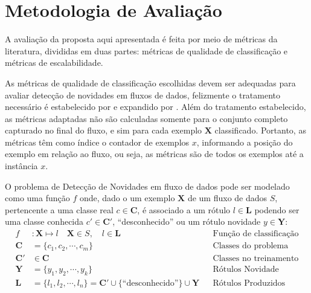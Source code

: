 \section{Metodologia de Avaliação}\label{sec:avaliacao}


A avaliação da proposta aqui apresentada é feita por meio de métricas da
literatura, divididas em duas partes: métricas de qualidade de classificação
e métricas de escalabilidade.

As métricas de qualidade de classificação escolhidas devem ser adequadas para
avaliar detecção de novidades em fluxos de dados, felizmente o tratamento necessário é
estabelecido por  e expandido por
.
Além do tratamento estabelecido, as métricas adaptadas não são calculadas
somente para o conjunto completo capturado no final do fluxo, e sim para cada
exemplo $\mathbf{X}$ classificado.
Portanto, as métricas têm como índice o contador de exemplos $x$, informando a
posição do exemplo em relação ao fluxo, ou seja, as métricas são de todos os
exemplos até a instância $x$.

\begin{definition}
  O problema de Detecção de Novidades em fluxo de dados pode ser modelado como
  uma função $f$ onde, dado o um exemplo $\mathbf{X}$ de um fluxo de dados $S$,
  pertencente a uma classe real $c \in \mathbf{C}$, é associado a um rótulo $l
  \in \mathbf{L}$ podendo ser uma classe conhecida $c' \in \mathbf{C}'$, ``desconhecido''
  ou um rótulo novidade $y \in \mathbf{Y}$:
  \begin{align}
    f  &: \mathbf{X} \mapsto l  \quad \mathbf{X} \in S , \quad l \in \mathbf{L}
      &&\text{Função de classificação} \label{eq:classifieFN} \\
    \mathbf{C} &= \{ c_1, c_2, \cdots, c_m \}
      &&\text{Classes do problema} \label{eq:classes} \\
    \mathbf{C}' &\in \mathbf{C}
      &&\text{Classes no treinamento} \label{eq:knownClasses} \\
    \mathbf{Y} &= \{ y_1, y_2, \cdots, y_k \}
      &&\text{Rótulos Novidade} \label{eq:novelies} \\
    \mathbf{L} &= \{ l_1, l_2, \cdots, l_n \} = \mathbf{C}' \cup \{ \text{``desconhecido''} \} \cup \mathbf{Y}
      &&\text{Rótulos Produzidos}\label{eq:labels} 
  \end{align}
\end{definition}

